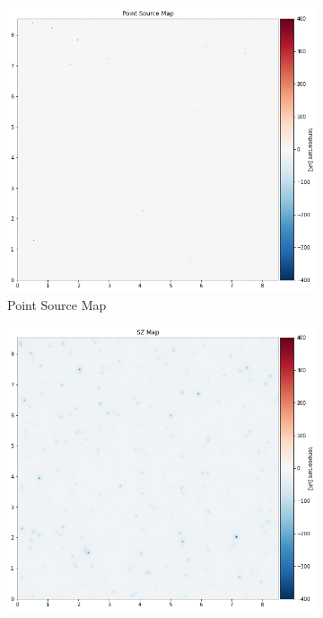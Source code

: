\documentclass[12pt]{article}
\begin{document}
\begin{figure}[h]
     \centering
     \begin{subfigure}[t]{0.3\textwidth}
         \centering
         \includegraphics[width=\textwidth]{images/point source map.png}
         \caption{Point Source Map}
         \label{fig:point_source_map}
     \end{subfigure}
     \hfill
     \begin{subfigure}[t]{0.3\textwidth}
         \centering
         \includegraphics[width=\textwidth]{images/SZ map.png}

\end{subfigure}
\end{figure}
\end{document}
